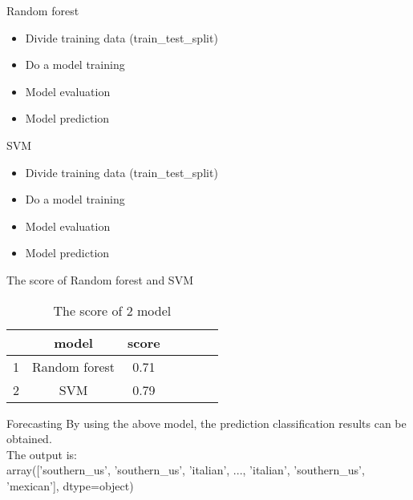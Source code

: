 \documentclass[
 size=12pt,
 paper=smartboard, %
 mode=present, %
 display=slides, %
style=tuliplab,
pauseslide,
fleqn,leqno]{powerdot}
\begin{document}
\begin{slide}[toc=,bm=]{ Random forest}
\begin{itemize}
  \item Divide training data (train_test_split)
  \item Do a model training
  \item Model evaluation
  \item Model prediction
\end{itemize}
\end{slide}

\begin{slide}[toc=,bm=]{SVM}
  \begin{itemize}
    \item Divide training data (train_test_split)
    \item Do a model training
    \item Model evaluation
    \item Model prediction
  \end{itemize}
\end{slide}

\begin{slide}[toc=,bm=]{The score of Random forest and SVM}
  \begin{table}[htbp]  \centering
    \caption{The score of 2 model}
    \label{tbl:data information}
    \begin{tabular}{ccccccc}
      \hline
        & model          & score \\
      \hline
      1 &  Random forest & 0.71  \\
      2 &  SVM           & 0.79  \\
      \hline 
    \end{tabular}
  \end{table}
\end{slide}


\begin{slide}[toc=,bm=]{Forecasting}
  By using the above model, the prediction classification results can be obtained.\\ 
\vspace{0.5cm}  The output is:\\
\vspace{0.5cm} array(['southern_us', 'southern_us', 'italian', ..., 'italian',
'southern_us', 'mexican'], dtype=object)
\end{slide}
\end{document}
